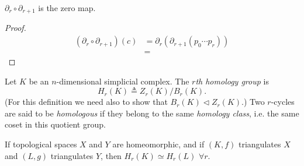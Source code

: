 \documentclass{article}
\begin{document}
\begin{lemma}
$\partial_r \circ \partial_{r+1}$ is the zero map.
\end{lemma}
\begin{proof}
\begin{align*}
(\partial_r \circ \partial_{r+1})(c)
&= \partial_r \left(
     \partial_{r+1}
       (p_0 \cdots p_r)
   \right) \\
&=
\end{align*}
\end{proof}

\begin{defn}
Let $K$ be an $n$-dimensional simplicial complex. The
\emph{$r$th homology group} is
$$
H_r(K) \triangleq Z_r(K) / B_r(K).
$$
(For this definition we need also to show that
 $B_r(K) \triangleleft Z_r(K)$.) Two $r$-cycles are said to be
 \emph{homologous} if they belong to the same \emph{homology class},
 i.e. the same coset in this quotient group.
\end{defn}

\begin{theorem}
If topological spaces $X$ and $Y$ are homeomorphic, and if $(K, f)$
triangulates $X$ and $(L, g)$ triangulates $Y$, then
$H_r(K) \simeq H_r(L)$ $\forall r$.
\end{theorem}
\end{document}
